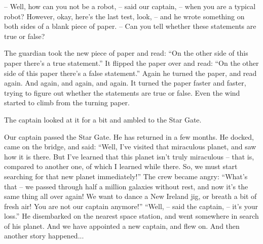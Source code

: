 \documentclass[ebook,oneside,final,openright]{memoir}
\begin{document}
– Well, how can you not be a robot, – said our captain, – when you are a typical robot? However, okay, here’s the last test, look, – and he wrote something on both sides of a blank piece of paper. – Can you tell whether these statements are true or false?\par
\par
The guardian took the new piece of paper and read: “On the other side of this paper there’s a true statement.” It flipped the paper over and read: “On the other side of this paper there’s a false statement.” Again he turned the paper, and read again. And again, and again, and again. It turned the paper faster and faster, trying to figure out whether the statements are true or false. Even the wind started to climb from the turning paper.\par
\par
The captain looked at it for a bit and ambled to the Star Gate.\par
Our captain passed the Star Gate. He has returned in a few months. He docked, came on the bridge, and said: “Well, I’ve visited that miraculous planet, and saw how it is there. But I’ve learned that this planet isn’t truly miraculous – that is, compared to another one, of which I learned while there. So, we must start searching for that new planet immediately!” The crew became angry: “What’s that – we passed through half a million galaxies without rest, and now it’s the same thing all over again! We want to dance a New Ireland jig, or breath a bit of fresh air! You are not our captain anymore!” “Well, – said the captain, – it’s your loss.” He disembarked on the nearest space station, and went somewhere in search of his planet. And we have appointed a new captain, and flew on. And then another story happened...
\end{document}
